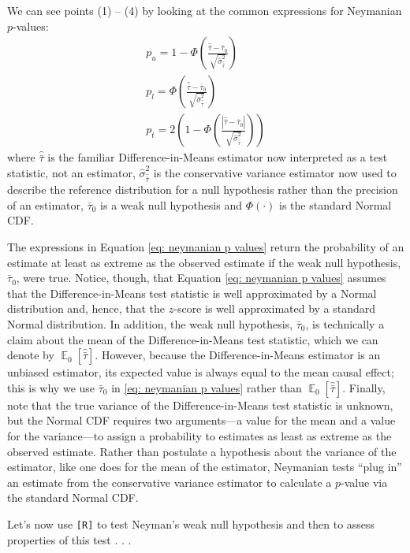 \documentclass[12pt,leqno]{article}
\theoremstyle{newstyle}
\DeclareMathOperator{\E}{\mathbb{E}}
\begin{document}
We can see points (1) -- (4) by looking at the common expressions for
Neymanian \(p\)-values: \begin{equation}
\label{eq: neymanian p values}
\begin{split}
p_u =  1 - \Phi\left(\frac{\hat{\bar{\tau}} - \bar{\tau}_0}{\sqrt{\hat{\sigma}^2_{\hat{\bar{\tau}}}}}\right) \\
p_l =  \Phi\left(\frac{\hat{\bar{\tau}} - \bar{\tau}_0}{\sqrt{\hat{\sigma}^2_{\hat{\bar{\tau}}}}}\right) \\
p_t = 2\left(1 - \Phi\left(\frac{\left\lvert\hat{\bar{\tau}} - \bar{\tau}_0\right\rvert}{\sqrt{\hat{\sigma}^2_{\hat{\bar{\tau}}}}}\right)\right)
\end{split}
\end{equation} where \(\hat{\bar{\tau}}\) is the familiar
Difference-in-Means estimator now interpreted as a test statistic, not
an estimator, \(\hat{\sigma}^2_{\hat{\bar{\tau}}}\) is the conservative
variance estimator now used to describe the reference distribution for a
null hypothesis rather than the precision of an estimator,
\(\bar{\tau}_0\) is a weak null hypothesis and
\(\Phi\left( \cdot \right)\) is the standard Normal CDF.

The expressions in Equation \ref{eq: neymanian p values} return the
probability of an estimate at least as extreme as the observed estimate
if the weak null hypothesis, \(\bar{\tau}_0\), were true. Notice,
though, that Equation \ref{eq: neymanian p values} assumes that the
Difference-in-Means test statistic is well approximated by a Normal
distribution and, hence, that the \(z\)-score is well approximated by a
standard Normal distribution. In addition, the weak null hypothesis,
\(\bar{\tau}_0\), is technically a claim about the mean of the
Difference-in-Means test statistic, which we can denote by
\(\E_0\left[\hat{\bar{\tau}}\right]\). However, because the
Difference-in-Means estimator is an unbiased estimator, its expected
value is always equal to the mean causal effect; this is why we use
\(\bar{\tau}_0\) in \cref{eq: neymanian p values} rather than
\(\E_0\left[\hat{\bar{\tau}}\right]\). Finally, note that the true
variance of the Difference-in-Means test statistic is unknown, but the
Normal CDF requires two arguments---a value for the mean and a value for
the variance---to assign a probability to estimates as least as extreme
as the observed estimate. Rather than postulate a hypothesis about the
variance of the estimator, like one does for the mean of the estimator,
Neymanian tests ``plug in'' an estimate from the conservative variance
estimator to calculate a \(p\)-value via the standard Normal CDF.

Let's now use \texttt{[R]} to test Neyman's weak null hypothesis and
then to assess properties of this test . . .

\newpage
\singlespacing 

\end{document}
